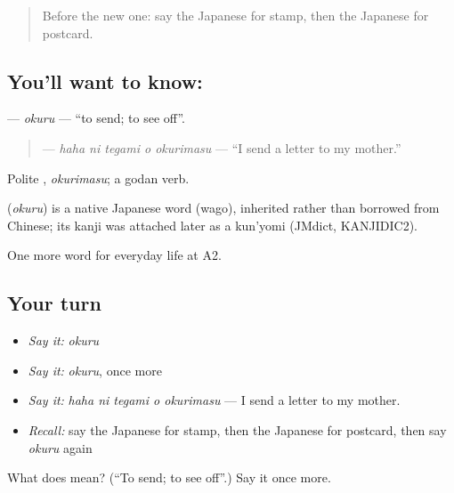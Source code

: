 \begin{quote}
Before the new one: say the Japanese for stamp, then the Japanese for postcard.
\end{quote}

\subsection*{You'll want to know: }
\textbf{} — \emph{okuru} — \textquotedblleft{}to send; to see off\textquotedblright{}.

\begin{quote}
\textbf{  } — \emph{haha ni tegami o okurimasu} — \textquotedblleft{}I send a letter to my mother.\textquotedblright{}
\end{quote}

Polite \textbf{}, \emph{okurimasu}; a godan verb.

\begin{cousinweb}
\textbf{} (\emph{okuru}) is a native Japanese word (wago), inherited rather than borrowed from Chinese; its kanji was attached later as a kun'yomi (JMdict, KANJIDIC2).
\end{cousinweb}

\begin{grammarlens}[title={What you've built}]
One more word for everyday life at A2.
\end{grammarlens}

\subsection*{Your turn}
\begin{itemize}
\raggedright
  \item \emph{Say it:} \emph{okuru}
  \item \emph{Say it:} \emph{okuru}, once more
  \item \emph{Say it:} \emph{haha ni tegami o okurimasu} — I send a letter to my mother.
  \item \emph{Recall:} say the Japanese for stamp, then the Japanese for postcard, then say \emph{okuru} again
\end{itemize}

\begin{tcolorbox}[breakable,colback=teal!4,colframe=teal!35!black,title={Before you move on}]
What does  mean? (\textquotedblleft{}To send; to see off\textquotedblright{}.) Say it once more.
\end{tcolorbox}
